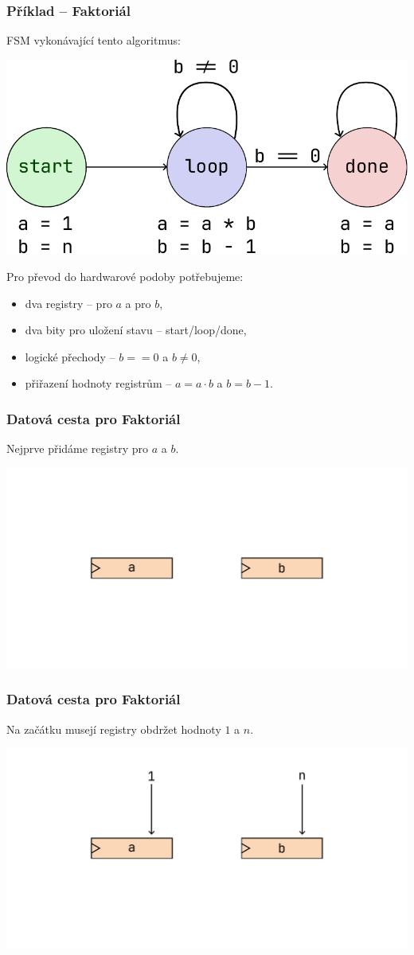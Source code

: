 \documentclass[aspectratio=169,11pt,svgnames]{beamer}
\begin{document}
\begin{frame}
 \frametitle{Příklad -- Faktoriál}
 FSM vykonávající tento algoritmus:
 \vspace*{-\parskip}
 \begin{center}
  \includegraphics[width=.4\textwidth]{factorial.pdf}
 \end{center}
 \vspace*{-\parskip}
 \pause
 Pro převod do hardwarové podoby potřebujeme:
 \pause
 \begin{itemize}[label=\textbullet,topsep=0pt]
  \item dva registry -- pro $a$ a pro $b$,
  \pause
  \item dva bity pro uložení stavu -- start/loop/done,
  \pause
  \item logické přechody -- $b == 0$ a $b \neq 0$,
  \pause
  \item přiřazení hodnoty registrům -- $a = a \cdot b$ a $b = b - 1$.
 \end{itemize}
\end{frame}

\begin{frame}
 \frametitle{Datová cesta pro Faktoriál}
 Nejprve přidáme registry pro $a$ a $b$.
 \begin{center}
  \includegraphics[width=.75\textwidth]{factorial-circuit-1.pdf}
 \end{center}
\end{frame}

\begin{frame}
 \frametitle{Datová cesta pro Faktoriál}
 Na začátku musejí registry obdržet hodnoty $1$ a $n$.
 \begin{center}
  \includegraphics[width=.75\textwidth]{factorial-circuit-2.pdf}
 \end{center}
\end{frame}
\end{document}
